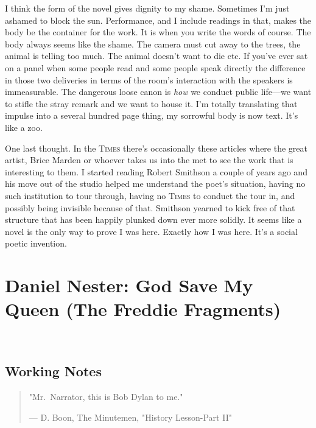 \documentclass[
]{memoir}
\begin{document}
I think the form of the novel gives dignity to my shame. Sometimes I'm
just ashamed to block the sun. Performance, and I include readings in
that, makes the body be the container for the work. It is when you write
the words of course. The body always seems like the shame. The camera
must cut away to the trees, the animal is telling too much. The animal
doesn't want to die etc. If you've ever sat on a panel when some people
read and some people speak directly the difference in those two
deliveries in terms of the room's interaction with the speakers is
immeasurable. The dangerous loose canon is \emph{how} we conduct public
life---we want to stifle the stray remark and we want to house it. I'm
totally translating that impulse into a several hundred page thing, my
sorrowful body is now text. It's like a zoo.

One last thought. In the \textsc{Times} there's occasionally these
articles where the great artist, Brice Marden or whoever takes us into
the met to see the work that is interesting to them. I started reading
Robert Smithson a couple of years ago and his move out of the studio
helped me understand the poet's situation, having no such institution to
tour through, having no \textsc{Times} to conduct the tour in, and
possibly being invisible because of that. Smithson yearned to kick free
of that structure that has been happily plunked down ever more solidly.
It seems like a novel is the only way to prove I was here. Exactly how I
was here. It's a social poetic invention.

\hypertarget{daniel-nester-god-save-my-queen-the-freddie-fragments}{%
\chapter{Daniel Nester: God Save My Queen (The Freddie
Fragments)}\label{daniel-nester-god-save-my-queen-the-freddie-fragments}}

~

\hypertarget{working-notes-5}{%
\section*{Working Notes}\label{working-notes-5}}

\begin{quote}
"Mr.~Narrator, this is Bob Dylan to me."

--- D. Boon, The Minutemen, "History Lesson-Part II"
\end{quote}
\end{document}
